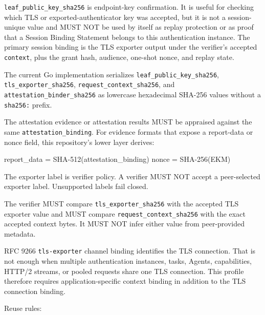 \documentclass[
]{article}
\newenvironment{Shaded}{}{}
\newcommand{\NormalTok}[1]{#1}
\begin{document}
\texttt{leaf\_public\_key\_sha256} is endpoint-key confirmation. It is
useful for checking which TLS or exported-authenticator key was
accepted, but it is not a session-unique value and MUST NOT be used by
itself as replay protection or as proof that a Session Binding Statement
belongs to this authentication instance. The primary session binding is
the TLS exporter output under the verifier's accepted \texttt{context},
plus the grant hash, audience, one-shot nonce, and replay state.

The current Go implementation serializes
\texttt{leaf\_public\_key\_sha256}, \texttt{tls\_exporter\_sha256},
\texttt{request\_context\_sha256}, and
\texttt{attestation\_binder\_sha256} as lowercase hexadecimal SHA-256
values without a \texttt{sha256:} prefix.

The attestation evidence or attestation results MUST be appraised
against the same \texttt{attestation\_binding}. For evidence formats
that expose a report-data or nonce field, this repository's lower layer
derives:

\begin{Shaded}
\begin{Highlighting}[]
\NormalTok{report_data = SHA{-}512(attestation_binding)}
\NormalTok{nonce       = SHA{-}256(EKM)}
\end{Highlighting}
\end{Shaded}

The exporter label is verifier policy. A verifier MUST NOT accept a
peer-selected exporter label. Unsupported labels fail closed.

The verifier MUST compare \texttt{tls\_exporter\_sha256} with the
accepted TLS exporter value and MUST compare
\texttt{request\_context\_sha256} with the exact accepted context bytes.
It MUST NOT infer either value from peer-provided metadata.

RFC 9266 \texttt{tls-exporter} channel binding identifies the TLS
connection. That is not enough when multiple authentication instances,
tasks, Agents, capabilities, HTTP/2 streams, or pooled requests share one
TLS connection. This profile therefore requires application-specific
context binding in addition to the TLS connection binding.

Reuse rules:
\end{document}
